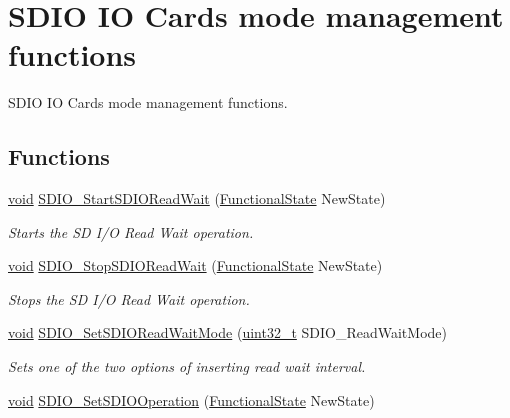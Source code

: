 \hypertarget{group___s_d_i_o___group4}{\section{S\-D\-I\-O I\-O Cards mode management functions}
\label{group___s_d_i_o___group4}
}


S\-D\-I\-O I\-O Cards mode management functions.  


\subsection*{Functions}
\begin{DoxyCompactItemize}
\item 
\hyperlink{group___n_a_m_e_ga18028b8badbf1ea7e704ccac3c488e82}{void} \hyperlink{group___s_d_i_o___group4_gac88f914d9a68a83abc2265ec8a7b79fc}{S\-D\-I\-O\-\_\-\-Start\-S\-D\-I\-O\-Read\-Wait} (\hyperlink{group___exported__types_gac9a7e9a35d2513ec15c3b537aaa4fba1}{Functional\-State} New\-State)
\begin{DoxyCompactList}\small\item\em Starts the S\-D I/\-O Read Wait operation. \end{DoxyCompactList}\item 
\hyperlink{group___n_a_m_e_ga18028b8badbf1ea7e704ccac3c488e82}{void} \hyperlink{group___s_d_i_o___group4_gaca6b25eb2debb73ac827c66f0ebcf837}{S\-D\-I\-O\-\_\-\-Stop\-S\-D\-I\-O\-Read\-Wait} (\hyperlink{group___exported__types_gac9a7e9a35d2513ec15c3b537aaa4fba1}{Functional\-State} New\-State)
\begin{DoxyCompactList}\small\item\em Stops the S\-D I/\-O Read Wait operation. \end{DoxyCompactList}\item 
\hyperlink{group___n_a_m_e_ga18028b8badbf1ea7e704ccac3c488e82}{void} \hyperlink{group___s_d_i_o___group4_ga2baac4ea1bb6c2d94345d2712604338a}{S\-D\-I\-O\-\_\-\-Set\-S\-D\-I\-O\-Read\-Wait\-Mode} (\hyperlink{stdint_8h_a435d1572bf3f880d55459d9805097f62}{uint32\-\_\-t} S\-D\-I\-O\-\_\-\-Read\-Wait\-Mode)
\begin{DoxyCompactList}\small\item\em Sets one of the two options of inserting read wait interval. \end{DoxyCompactList}\item 
\hyperlink{group___n_a_m_e_ga18028b8badbf1ea7e704ccac3c488e82}{void} \hyperlink{group___s_d_i_o___group4_ga24e210c185d5a7855cbaff4472a8f8d1}{S\-D\-I\-O\-\_\-\-Set\-S\-D\-I\-O\-Operation} (\hyperlink{group___exported__types_gac9a7e9a35d2513ec15c3b537aaa4fba1}{Functional\-State} New\-State)

\end{DoxyCompactItemize}

